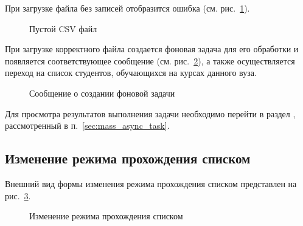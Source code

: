 При загрузке файла без записей отобразится ошибка (см. рис.~\ref{img:student:mass_enroll_empty_csv}).
\begin{figure}[H]
	\caption{Пустой CSV файл}
	\label{img:student:mass_enroll_empty_csv}
\end{figure}

При загрузке корректного файла создается фоновая задача для его обработки и появляется соответствующее сообщение 
(см. рис.~\ref{img:student:mass_student_enroll_task}), а также осуществляется переход на список студентов, обучающихся на курсах данного вуза.

\begin{figure}[H]
	\caption{Сообщение о создании фоновой задачи}
	\label{img:student:mass_student_enroll_task}
\end{figure}

Для просмотра результатов выполнения задачи необходимо перейти в раздел , 
рассмотренный в п.~\ref{sec:mass_async_task}.

\subsection{Изменение режима прохождения списком}
Внешний вид формы изменения режима прохождения списком представлен на рис.~\ref{img:student:mass_change_mode}.
\begin{figure}[H]
	\caption{Изменение режима прохождения списком}
	\label{img:student:mass_change_mode}
\end{figure}

